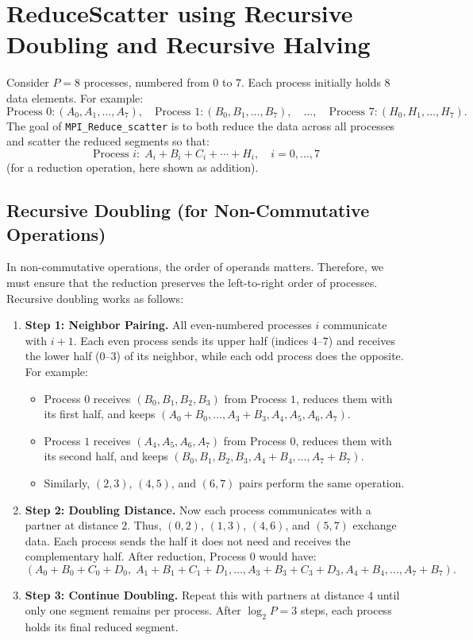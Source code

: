 \documentclass[12pt]{book}
\begin{document}
\section*{ReduceScatter using Recursive Doubling and Recursive Halving}

Consider $P=8$ processes, numbered from $0$ to $7$. Each process initially holds $8$ data elements. For example:
\[
\text{Process } 0: (A_0,A_1,\ldots,A_7),\quad
\text{Process } 1: (B_0,B_1,\ldots,B_7),\quad \ldots,\quad
\text{Process } 7: (H_0,H_1,\ldots,H_7).
\]
The goal of \texttt{MPI\_Reduce\_scatter} is to both reduce the data across all processes and scatter the reduced segments so that:
\[
\text{Process } i:\; A_i + B_i + C_i + \cdots + H_i,\quad i=0,\ldots,7
\]
(for a reduction operation, here shown as addition).

\subsection*{Recursive Doubling (for Non-Commutative Operations)}
In non-commutative operations, the order of operands matters. Therefore, we must ensure that the reduction preserves the left-to-right order of processes. Recursive doubling works as follows:

\begin{enumerate}
    \item \textbf{Step 1: Neighbor Pairing.} All even-numbered processes $i$ communicate with $i+1$. Each even process sends its upper half (indices $4$--$7$) and receives the lower half ($0$--$3$) of its neighbor, while each odd process does the opposite. For example:
    \begin{itemize}
        \item Process $0$ receives $(B_0,B_1,B_2,B_3)$ from Process $1$, reduces them with its first half, and keeps $(A_0+B_0,\ldots,A_3+B_3,A_4,A_5,A_6,A_7)$.
        \item Process $1$ receives $(A_4,A_5,A_6,A_7)$ from Process $0$, reduces them with its second half, and keeps $(B_0,B_1,B_2,B_3,A_4+B_4,\ldots,A_7+B_7)$.
        \item Similarly, $(2,3)$, $(4,5)$, and $(6,7)$ pairs perform the same operation.
    \end{itemize}

    \item \textbf{Step 2: Doubling Distance.} Now each process communicates with a partner at distance $2$. Thus, $(0,2)$, $(1,3)$, $(4,6)$, and $(5,7)$ exchange data. Each process sends the half it does not need and receives the complementary half. After reduction, Process $0$ would have:
    \[
    (A_0+B_0+C_0+D_0,\;A_1+B_1+C_1+D_1,\ldots, A_3+B_3+C_3+D_3, A_4+B_4,\ldots,A_7+B_7).
    \]

    \item \textbf{Step 3: Continue Doubling.} Repeat this with partners at distance $4$ until only one segment remains per process. After $\log_2 P=3$ steps, each process holds its final reduced segment.
\end{enumerate}
\end{document}
